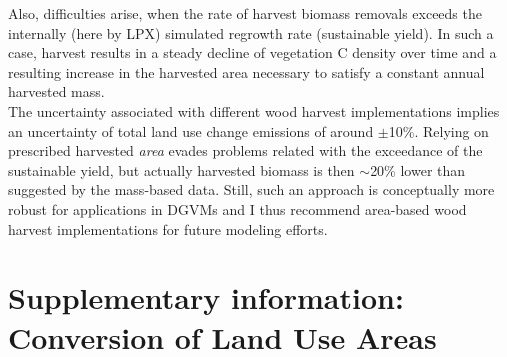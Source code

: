 Also, difficulties arise, when the rate of harvest biomass removals exceeds the internally (here by LPX) simulated regrowth rate (sustainable yield). In such a case, harvest results in a steady decline of vegetation C density over time and a resulting increase in the harvested area necessary to satisfy a constant annual harvested mass.\\

The uncertainty associated with different wood harvest implementations implies an uncertainty of total land use change emissions of around $\pm$10\%. Relying on prescribed harvested {\it area} evades problems related with the exceedance of the sustainable yield, but actually harvested biomass is then $\sim$20\% lower than suggested by the mass-based data. Still, such an approach is conceptually more robust for applications in DGVMs and I thus recommend area-based wood harvest implementations for future modeling efforts.

\section{Supplementary information: Conversion of Land Use Areas}
\label{app1}

